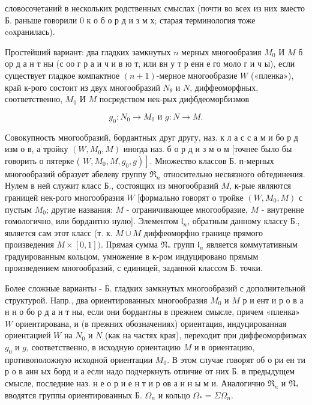 \documentclass[10pt]{article}
\begin{document}
словосочетаний в нескольких родственных смыслах (почти во всех из них вместо Б. раньше говорили 0 к о б о р д и з м х; старая терминология тоже coхранилась).



Простейший вариант: два гладких замкнутых $n$ мерных многообразия $M_{0}$ И $M$ б ор д а н т ны (с оо г р а и ч и в ю т, или вн у т р енн е го моло г и ч ы), если существует гладкое компактное $(n+1)$-мерное многообразие $W$ («пленка»), край к-рого состоит из двух многообразий $N_{\theta}$ и $N$, диффеоморфных, соответственно, $M_{0}$ И $M$ посредством нек-рых дифбдеоморбизмов



\[

g_{0}: N_{0} \rightarrow M_{0} \text { и } g: N \rightarrow M .

\]



Совокупность многообразий, бордантных друг другу, наз. к л а с с а м и бо р д изм о в, а тройку $\left(W, M_{0}, M\right)$ иногда наз. б о р д и з м о м [точнее было бы говорить о пятерке ( $\left.\left.W, M_{0}, M, g_{0}, g\right)\right]$. Множество классов Б. п-мерных многообразий образует абелеву группу $\mathfrak{R}_{n}$ относительно несвязного обтединения. Нулем в ней служит класс Б., состоящих из многообразий $M$, к-рые являются границей нек-рого многообразия $W$ [формально говорят о тройке $\left(W, M_{0}, M\right)$ с пустым $M_{0}$; другие названия: $M$ - ограничивающее многообразие, $M$ - внутренне гомологично, или бордантно нулю]. Элементом $\mathfrak{l}_{n}$, обратным данному классу Б., является сам этот класс (т. к. $M \cup M$ диффеоморфно границе прямого произведения $M \times[0,1])$. Прямая сумма $\mathfrak{N}_{*}$ групп $\mathfrak{l}_{n}$ является коммутативным градуированным кольцом, умножение в к-ром индуцировано прямым произведением многообразий, с единицей, заданной классом Б. точки.



Более сложные варианты - Б. гладких замкнутых многообразий с дополнительной структурой. Напр., два ориентированных многообразия $M_{0}$ и $M$ р и ент и р о в а н н о бо р д а н т ны, если они бордантны в прежнем смысле, причем «пленка» $W$ ориентирована, и (в прежних обозначениях) ориентация, индуцированная ориентацией $W$ на $N_{0}$ и $N$ (как на частях края), переходит при диффеоморфизмах $g_{0}$ и $g$, соответственно, в исходную ориентацию $M$ и в ориентацию, противоположную исходной ориентации $M_{0}$. В этом случае говорят об о ри ен ти р о в анн ых борд и а если надо подчеркнуть отличие от них Б. в предыдущем смысле, последние наз. н е о р и е н т и р ов а н н ы м и. Аналогично $\mathfrak{R}_{n}$ и $\mathfrak{N}_{*}$ вводятся группы ориентированных Б. $\Omega_{n}$ и кольцо $\Omega_{*}=\Sigma \Omega_{n}$.
\end{document}
